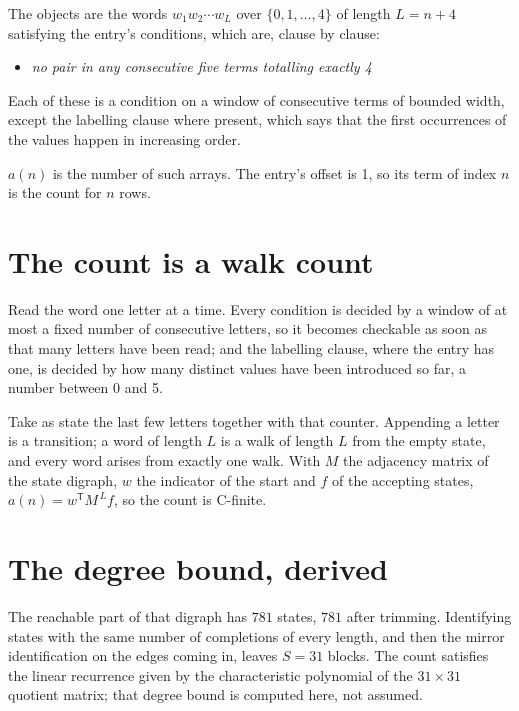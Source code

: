 \documentclass[11pt]{article}
\theoremstyle{definition}
\begin{document}
The objects are the words $w_1 w_2 \cdots w_L$ over $\{0,1,\dots,4\}$ of length $L = n + 4$ satisfying the entry's conditions, which are, clause by clause:

\begin{itemize}

\item {\itshape no pair in any consecutive five terms totalling exactly 4}

\end{itemize}

Each of these is a condition on a window of consecutive terms of bounded width, except the labelling clause where present, which says that the first occurrences of the values happen in increasing order.

$a(n)$ is the number of such arrays. The entry's offset is 1, so its term of index $n$ is the count for $n$ rows.

\section{The count is a walk count}

Read the word one letter at a time. Every condition is decided by a window of at most a fixed number of consecutive letters, so it becomes checkable as soon as that many letters have been read; and the labelling clause, where the entry has one, is decided by how many distinct values have been introduced so far, a number between $0$ and 5.

Take as state the last few letters together with that counter. Appending a letter is a transition; a word of length $L$ is a walk of length $L$ from the empty state, and every word arises from exactly one walk. With $M$ the adjacency matrix of the state digraph, $w$ the indicator of the start and $f$ of the accepting states, $a(n) = w^{\mathsf T}M^{\,L}f$, so the count is C-finite.

\section{The degree bound, derived}

The reachable part of that digraph has $781$ states, $781$ after trimming. Identifying states with the same number of completions of every length, and then the mirror identification on the edges coming in, leaves $S = 31$ blocks. The count satisfies the linear recurrence given by the characteristic polynomial of the $31\times31$ quotient matrix; that degree bound is computed here, not assumed.
\end{document}
